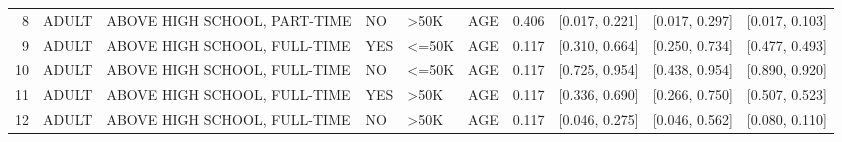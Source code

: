 \begin{table}
\begin{tabular}{rlllllllll}
8 & ADULT & ABOVE HIGH SCHOOL, PART-TIME & NO & >50K & AGE & 0.406 & [0.017, 0.221] & [0.017, 0.297] & [0.017, 0.103] \\
9 & ADULT & ABOVE HIGH SCHOOL, FULL-TIME & YES & <=50K & AGE & 0.117 & [0.310, 0.664] & [0.250, 0.734] & [0.477, 0.493] \\
10 & ADULT & ABOVE HIGH SCHOOL, FULL-TIME & NO & <=50K & AGE & 0.117 & [0.725, 0.954] & [0.438, 0.954] & [0.890, 0.920] \\
11 & ADULT & ABOVE HIGH SCHOOL, FULL-TIME & YES & >50K & AGE & 0.117 & [0.336, 0.690] & [0.266, 0.750] & [0.507, 0.523] \\
12 & ADULT & ABOVE HIGH SCHOOL, FULL-TIME & NO & >50K & AGE & 0.117 & [0.046, 0.275] & [0.046, 0.562] & [0.080, 0.110] \\
\bottomrule
\end{tabular}
\end{table}
